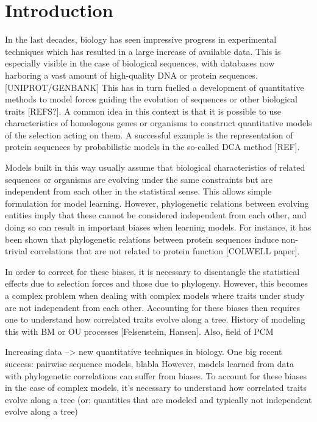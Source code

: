 \documentclass[preprint,amsmath,amssymb,superscriptaddress,showpacs,pre]{revtex4-1}
\begin{document}
\maketitle


\section{Introduction}
\label{sec:int}

In the last decades, biology has seen impressive progress in experimental techniques which has resulted in a large increase of available data. 
This is especially visible in the case of biological sequences,  with databases now harboring a vast amount of high-quality DNA or protein sequences. [UNIPROT/GENBANK]
This has in turn fuelled a development of quantitative methods to model forces guiding the evolution of sequences or other biological traits [REFS?]. 
A common idea in this context is that it is possible to use characteristics of homologous genes or organisms to construct quantitative models of the selection acting on them. 
A successful example is the representation of protein sequences by probabilistic models in the so-called DCA method [REF]. 

Models built in this way usually assume that biological characteristics of related sequences or organisms are evolving under the same constraints but are independent from each other in the statistical sense. 
This allows simple formulation for model learning. 
However, phylogenetic relations between evolving entities imply that these cannot be considered independent from each other, and doing so can result in important biases when learning models. 
For instance, it has been shown that phylogenetic relations between protein sequences induce non-trivial correlations that are not related to protein function [COLWELL paper]. 

In order to correct for these biases, it is necessary to disentangle the statistical effects due to selection forces and those due to phylogeny. 
However, this becomes a complex problem when dealing with complex models where traits under study are not independent from each other. 
Accounting for these biases then requires one to understand how correlated traits evolve along a tree. 
History of modeling this with BM or OU processes [Felsenstein, Hansen]. Also, field of PCM 

Increasing data --> new quantitative techniques in biology. 
One big recent success: pairwise sequence models, blabla
However, models learned from data with phylogenetic correlations can suffer from biases. To account for these biases in the case of complex models, it's necessary to understand how correlated traits evolve along a tree (or: quantities that are modeled and typically not independent evolve along a tree)
\end{document}
